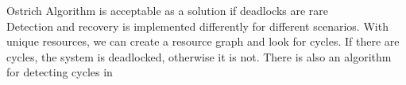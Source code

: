 \documentclass{article}
\begin{document}
Ostrich Algorithm is acceptable as a solution if deadlocks are rare
\\Detection and recovery is implemented differently for different scenarios. With unique resources, we can create a resource graph and look for cycles. If there are cycles, the system is deadlocked, otherwise it is not. There is also an algorithm for detecting cycles in 
\end{document}
